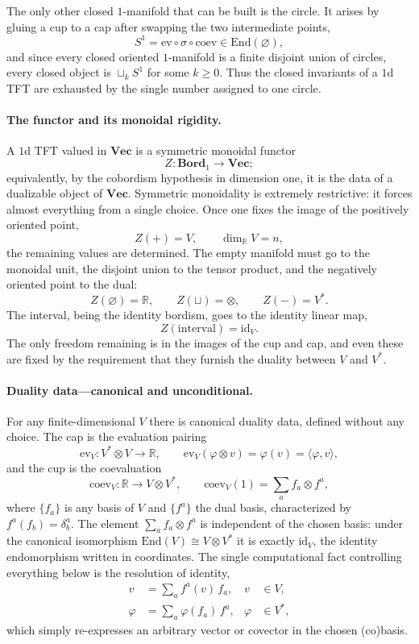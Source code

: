 \documentclass[prl,aps,10pt,superscriptaddress, floatfix]{revtex4-2}
\begin{document}
The only other closed $1$-manifold that can be built is the circle. It arises by gluing a cup to a cap after swapping the two intermediate points,
\[
S^1=\mathrm{ev}\circ\sigma\circ\mathrm{coev}\in\mathrm{End}(\varnothing),
\]
and since every closed oriented $1$-manifold is a finite disjoint union of circles, every closed object is $\sqcup_k S^1$ for some $k\ge 0$. Thus the closed invariants of a $1$d TFT are exhausted by the single number assigned to one circle.

\paragraph{The functor and its monoidal rigidity.}
A $1$d TFT valued in $\mathbf{Vec}$ is a symmetric monoidal functor
\[
Z:\mathbf{Bord}_1\to\mathbf{Vec};
\]
equivalently, by the cobordism hypothesis in dimension one, it is the data of a dualizable object of $\mathbf{Vec}$. Symmetric monoidality is extremely restrictive: it forces almost everything from a single choice. Once one fixes the image of the positively oriented point,
\[
Z(+)=V,\qquad \dim_{\mathbb R}V=n,
\]
the remaining values are determined. The empty manifold must go to the monoidal unit, the disjoint union to the tensor product, and the negatively oriented point to the dual:
\[
Z(\varnothing)=\mathbb R,\qquad Z(\sqcup)=\otimes,\qquad Z(-)=V^*.
\]
The interval, being the identity bordism, goes to the identity linear map,
\[
Z(\text{interval})=\mathrm{id}_V.
\]
The only freedom remaining is in the images of the cup and cap, and even these are fixed by the requirement that they furnish the duality between $V$ and $V^*$.

\paragraph{Duality data---canonical and unconditional.}
For any finite-dimensional $V$ there is canonical duality data, defined without any choice. The cap is the evaluation pairing
\[
\mathrm{ev}_V:V^*\otimes V\to\mathbb R,\qquad
\mathrm{ev}_V(\varphi\otimes v)=\varphi(v)=\langle\varphi,v\rangle,
\]
and the cup is the coevaluation
\[
\mathrm{coev}_V:\mathbb R\to V\otimes V^*,\qquad
\mathrm{coev}_V(1)=\sum_a f_a\otimes f^a,
\]
where $\{f_a\}$ is any basis of $V$ and $\{f^a\}$ the dual basis, characterized by $f^a(f_b)=\delta^a_b$. The element $\sum_a f_a\otimes f^a$ is independent of the chosen basis: under the canonical isomorphism $\mathrm{End}(V)\cong V\otimes V^*$ it is exactly $\mathrm{id}_V$, the identity endomorphism written in coordinates. The single computational fact controlling everything below is the resolution of identity,
\begin{align}
v&=\sum_a f^a(v)\,f_a, & v&\in V,\label{eq:resV}\\
\varphi&=\sum_a \varphi(f_a)\,f^a, & \varphi&\in V^*,\label{eq:resVstar}
\end{align}
which simply re-expresses an arbitrary vector or covector in the chosen (co)basis.
\end{document}
